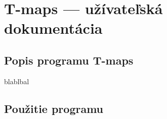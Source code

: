 \chapter{T-maps --- užívateľská dokumentácia}

\section{Popis programu T-maps}
blablbal

\section{Použitie programu}


